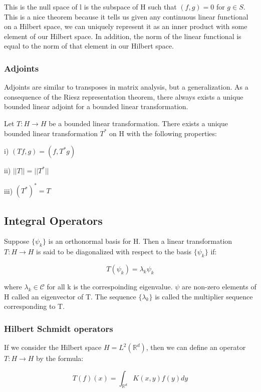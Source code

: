 \documentclass[class=article, crop=false]{standalone}
\begin{document}
		This is the null space of l is the subspace of H such that $(f,g) = 0$ for $g \in S$. This is a nice theorem because it tells us given any continuous linear functional on a Hilbert space, we can uniquely represent it as an inner product with some element of our Hilbert space. In addition, the norm of the linear functional is equal to the norm of that element in our Hilbert space.

		\subsubsection{Adjoints}
			Adjoints are similar to transposes in matrix analysis, but a generalization. As a consequence of the Riesz representation theorem, there always exists a unique bounded linear adjoint for a bounded linear transformation.

			\begin{proposition}
				Let $T: H \rightarrow H$ be a bounded linear transformation. There exists a unique bounded linear transformation $T^*$ on H with the following properties:

				i) $(Tf, g) = (f, T^*g)$

				ii) $||T|| = ||T^*||$

				iii) $(T^*)^* = T$
			\end{proposition} 

	\subsection{Integral Operators}
		Suppose $\{\psi_k\}$ is an orthonormal basis for H. Then a linear transformation $T: H \rightarrow H$ is said to be diagonalized with respect to the basis $\{\psi_k\}$ if:

			$$T(\psi_k) = \lambda_k \psi_k$$

		where $\lambda_k \in \mathcal{C}$ for all k is the correspoinding eigenvalue. $\psi$ are non-zero elements of H called an eigenvector of T. The sequence $\{\lambda_k\}$ is called the multiplier sequence corresponding to T.

		\subsubsection{Hilbert Schmidt operators}
			If we consider the Hilbert space $H = L^2(\mathbb{R}^d)$, then we can define an operator $T: H \rightarrow H$ by the formula:

				$$T(f)(x) = \int_{\mathbb{R}^d} K(x,y) f(y) dy$$
\end{document}
